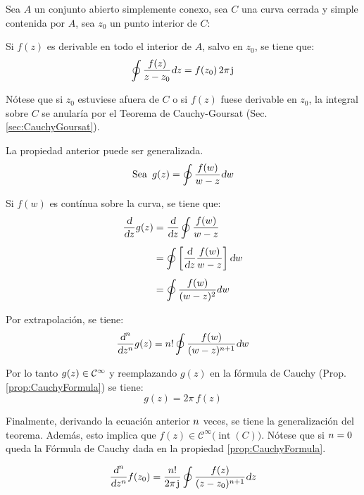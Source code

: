 Sea $A$ un conjunto abierto simplemente conexo, sea $C$ una curva cerrada y simple contenida por $A$, sea $z_0$ un punto interior de $C$:

\begin{center}
    \def\svgwidth{0.6\linewidth}
    
\end{center}

\begin{mdframed}[style=PropertyFrame]
    \begin{prop}
        \label{prop:CauchyFormula}
    \end{prop}
    Si $f(z)$ es derivable en todo el interior de $A$, salvo en $z_0$, se tiene que:
    \begin{equation*}
        \oint \frac{f(z)}{z - z_0} \dif z = f(z_0) \, 2 \pi \iu
    \end{equation*}
\end{mdframed}

Nótese que si $z_0$ estuviese afuera de $C$ o si $f(z)$ fuese derivable en $z_0$, la integral sobre $C$ se anularía por el Teorema de Cauchy-Goursat (Sec. \ref{sec:CauchyGoursat}).

La propiedad anterior puede ser generalizada.
\begin{equation*}
    \textrm{Sea} \enspace g(z) = \oint \frac{f(w)}{w - z} \dif w
\end{equation*}

Si $f(w)$ es contínua sobre la curva, se tiene que:
\begin{align*}
    \frac{\dif}{\dif z} g(z) &= \frac{\dif}{\dif z} \oint \frac{f(w)}{w-z}
    \\[1ex]
    &= \oint \left[ \frac{\dif}{\dif z} \frac{f(w)}{w-z} \right] \dif w
    \\[1ex]
    &= \oint \dfrac{f(w)}{(w-z)^2} dw
\end{align*}

Por extrapolación, se tiene:
\begin{equation*}
    \frac{\dif^\nth}{\dif z^\nth} g(z) = \nth! \oint \frac{f(w)}{(w-z)^{\nth+1}} \dif w
\end{equation*}

Por lo tanto $g(z) \in \class[\infty]$ y reemplazando $g(z)$ en la fórmula de Cauchy (Prop. \ref{prop:CauchyFormula}) se tiene:
\begin{equation*}
    g(z) = 2 \pi \, f(z)
\end{equation*}

Finalmente, derivando la ecuación anterior $\nth$ veces, se tiene la generalización del teorema.
Además, esto implica que $f(z) \in \mathcal{C} ^ \infty \big( \operatorname{int}(C) \big)$.
Nótese que si $\nth=0$ queda la Fórmula de Cauchy dada en la propiedad \ref{prop:CauchyFormula}.

\begin{mdframed}[style=PropertyFrame]
    \begin{prop}
    \end{prop}
    \begin{equation*}
        \frac{\dif^\nth}{\dif z^\nth} f(z_0) = \frac{\nth!}{2 \pi \iu} \oint \frac{f(z)}{(z-z_0)^{\nth+1}} \dif z
    \end{equation*}
\end{mdframed}